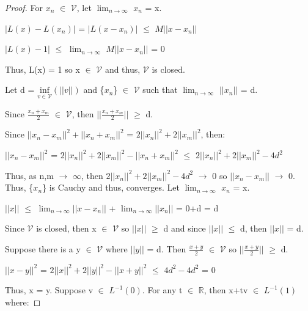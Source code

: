     \begin{proof}
        For $x_n$ $\in$ $\mathcal{V}$, let $\lim_{n \rightarrow \infty}$ $x_n$ = x.

        \hspace{0.5cm}
        $|L(x) - L(x_n)|$
        = $|L(x - x_n)|$
        $\leq$ $M || x-x_n ||$

        \hspace{0.5cm}
        $|L(x) - 1|$
        $\leq$ $\lim_{n \rightarrow \infty}$ $M || x-x_n ||$
        = 0

        Thus, L(x) = 1 so x $\in$ $\mathcal{V}$
        and thus, $\mathcal{V}$ is closed.

        Let d = $\underset{v \in \mathcal{V}}{\text{inf}} (||v||)$
        and \{$x_n$\} $\in$ $\mathcal{V}$ such that
        $\lim_{n \rightarrow \infty}$ $||x_n||$ = d.

        Since $\frac{x_n + x_m}{2}$ $\in$ $\mathcal{V}$, then
        $|| \frac{x_n + x_m}{2} ||$ $\geq$ d.

        Since $||x_n - x_m||^2 + ||x_n + x_m||^2$
        = $2||x_n||^2 + 2||x_m||^2$, then:

        \hspace{0.5cm}
        $||x_n - x_m||^2$
        = $2||x_n||^2 + 2||x_m||^2 - ||x_n + x_m||^2$
        $\leq$ $2||x_n||^2 + 2||x_m||^2 - 4d^2$

        Thus, as n,m $\rightarrow$ $\infty$, then
        $2||x_n||^2 + 2||x_m||^2 - 4d^2$ $\rightarrow$ 0
        so $||x_n - x_m||$ $\rightarrow$ 0.
        Thus, \{$x_n$\} is Cauchy and thus, converges.
        Let $\lim_{n \rightarrow \infty}$ $x_n$ = x.

        \hspace{0.5cm}
        $||x||$
        $\leq$ $\lim_{n \rightarrow \infty} || x-x_n ||$
                + $\lim_{n \rightarrow \infty} || x_n ||$
        = 0+d = d

        Since $\mathcal{V}$ is closed, then x $\in$ $\mathcal{V}$
        so $||x||$ $\geq$ d and since $||x||$ $\leq$ d, then $||x||$ = d.
        
        Suppose there is a y $\in$ $\mathcal{V}$ where $||y||$ = d.
        Then $\frac{x+y}{2}$ $\in$ $\mathcal{V}$ so
        $|| \frac{x+y}{2} ||$ $\geq$ d.
        
        \hspace{0.5cm}
        $||x-y||^2$ = $2||x||^2 + 2||y||^2 - ||x+y||^2$
        $\leq$ $4d^2 - 4d^2$ = 0

        Thus, x = y.
        Suppose v $\in$ $L^{-1}(0)$.
        For any t $\in$ $\mathbb{R}$, then x+tv $\in$ $L^{-1}(1)$ where:
        

\end{proof}

